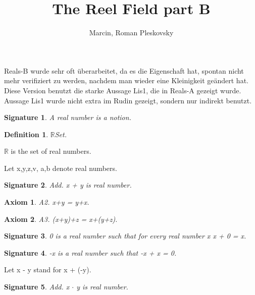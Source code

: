 \documentclass{article}
\newenvironment{forthel}{\begin{leftbar}}{\end{leftbar}}
\newtheorem{axiom}{Axiom}
\newtheorem{definition}{Definition}
\newtheorem{signature}{Signature}
\begin{document}
\title{The Reel Field part B}
\author{Marcin, Roman Pleskovsky}
\maketitle

Reals-B wurde sehr oft überarbeitet, da es die Eigenschaft hat, spontan nicht mehr verifiziert zu werden, nachdem man wieder eine Kleinigkeit ge\"andert hat.\\

Diese Version benutzt die starke Aussage Lis1, die in Reals-A gezeigt wurde.\\
Aussage Lis1 wurde nicht extra im Rudin gezeigt, sondern nur indirekt benutzt.\\

\begin{forthel}
[set/-s] [element/-s] [number/-s] [integer/-s]

\begin{signature} A real number is a notion.

\end{signature}

\begin{definition} $\mathbb{R}$Set.

\end{definition}
$\mathbb{R}$ is the set of real numbers.

Let x,y,z,v, a,b denote real numbers.



\begin{signature} Add. x + y is real number.

\end{signature}
\begin{axiom} A2. x+y = y+x.

\end{axiom}
\begin{axiom} A3. (x+y)+z = x+(y+z).

\end{axiom}
\begin{signature} 0 is a real number such that for every real number x x + 0 = x.

\end{signature}
\begin{signature} -x is a real number such that -x + x = 0.

\end{signature}

Let x - y stand for x + (-y).

\begin{signature} Add. x $\cdot$ y is real number.


\end{signature}
\end{forthel}
\end{document}
